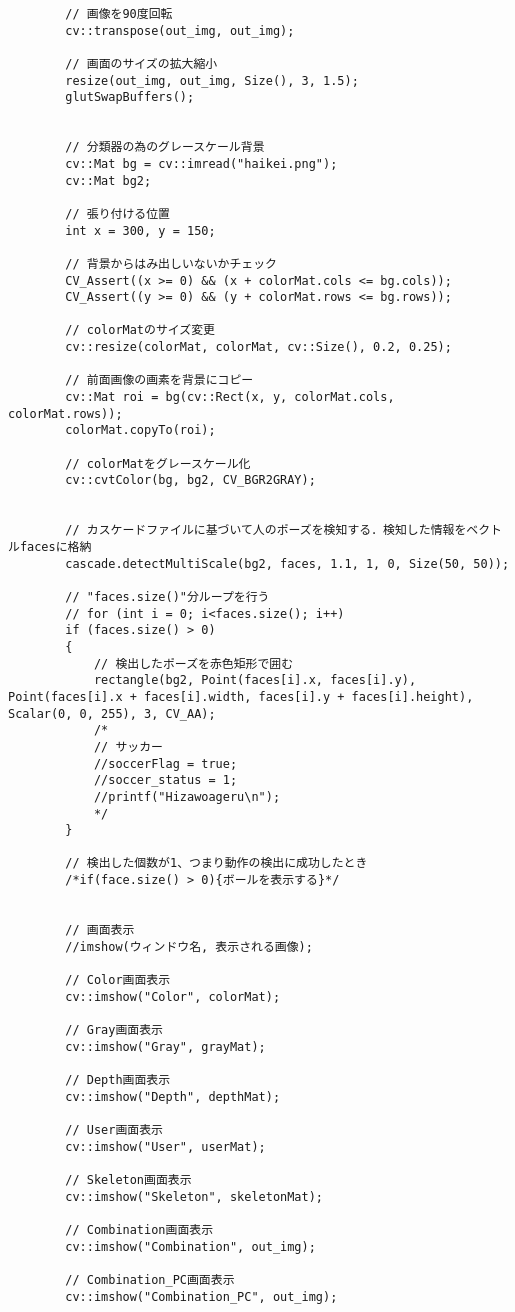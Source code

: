 \begin{lstlisting}
		// 画像を90度回転
		cv::transpose(out_img, out_img);

		// 画面のサイズの拡大縮小
		resize(out_img, out_img, Size(), 3, 1.5); 
		glutSwapBuffers();


		// 分類器の為のグレースケール背景
		cv::Mat bg = cv::imread("haikei.png");
		cv::Mat bg2;

		// 張り付ける位置
		int x = 300, y = 150;
		
		// 背景からはみ出しいないかチェック
		CV_Assert((x >= 0) && (x + colorMat.cols <= bg.cols));
		CV_Assert((y >= 0) && (y + colorMat.rows <= bg.rows));
		
		// colorMatのサイズ変更
		cv::resize(colorMat, colorMat, cv::Size(), 0.2, 0.25);
		
		// 前面画像の画素を背景にコピー
		cv::Mat roi = bg(cv::Rect(x, y, colorMat.cols, colorMat.rows));
		colorMat.copyTo(roi);
		
		// colorMatをグレースケール化
		cv::cvtColor(bg, bg2, CV_BGR2GRAY);


		// カスケードファイルに基づいて人のポーズを検知する．検知した情報をベクトルfacesに格納
		cascade.detectMultiScale(bg2, faces, 1.1, 1, 0, Size(50, 50));

		// "faces.size()"分ループを行う
		// for (int i = 0; i<faces.size(); i++)
		if (faces.size() > 0)
		{
			// 検出したポーズを赤色矩形で囲む
			rectangle(bg2, Point(faces[i].x, faces[i].y), Point(faces[i].x + faces[i].width, faces[i].y + faces[i].height), Scalar(0, 0, 255), 3, CV_AA); 
			/*
			// サッカー
			//soccerFlag = true;
			//soccer_status = 1;
			//printf("Hizawoageru\n");
			*/
		}
		
		// 検出した個数が1、つまり動作の検出に成功したとき
		/*if(face.size() > 0){ボールを表示する}*/


		// 画面表示 
		//imshow(ウィンドウ名, 表示される画像);

		// Color画面表示
		cv::imshow("Color", colorMat);
		
		// Gray画面表示
		cv::imshow("Gray", grayMat);
		
		// Depth画面表示
		cv::imshow("Depth", depthMat);
		
		// User画面表示
		cv::imshow("User", userMat);
		
		// Skeleton画面表示
		cv::imshow("Skeleton", skeletonMat);
		
		// Combination画面表示
		cv::imshow("Combination", out_img);
		
		// Combination_PC画面表示
		cv::imshow("Combination_PC", out_img);
		

\end{lstlisting}

